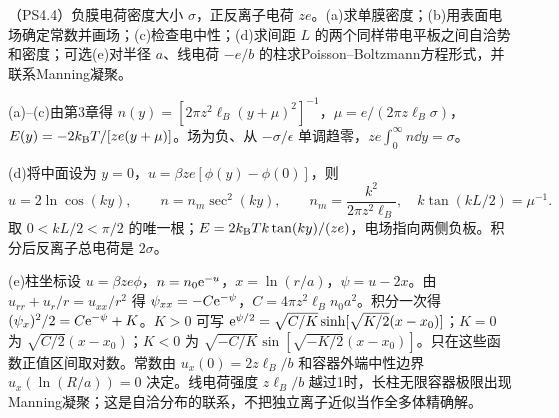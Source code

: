 \begin{exercise}
（PS4.4）负膜电荷密度大小 $\sigma$，正反离子电荷 $ze$。(a)求单膜密度；(b)用表面电场确定常数并画场；(c)检查电中性；(d)求间距 $L$ 的两个同样带电平板之间自洽势和密度；可选(e)对半径 $a$、线电荷 $-e/b$ 的柱求Poisson--Boltzmann方程形式，并联系Manning凝聚。
\end{exercise}
\begin{solution}
(a)--(c)由第3章得 $n(y)=[2\pi z^2\ell_B(y+\mu)^2]^{-1}$，$\mu=e/(2\pi z\ell_B\sigma)$，$E(y)=-2k_{\mathrm B} T/[ze(y+\mu)]$。场为负、从 $-\sigma/\epsilon$ 单调趋零，$ze\int_0^\infty n\dd y=\sigma$。

\begin{center}\end{center}
(d)将中面设为 $y=0$，$u=\beta ze[\phi(y)-\phi(0)]$，则
\[
u=2\ln\cos(ky),\qquad n=n_m\sec^2(ky),\qquad n_m=\frac{k^2}{2\pi z^2\ell_B},\quad
k\tan(kL/2)=\mu^{-1}.
\]
取 $0<kL/2<\pi/2$ 的唯一根；$E=2k_{\mathrm B} T k\tan(ky)/(ze)$，电场指向两侧负板。积分后反离子总电荷是 $2\sigma$。

(e)柱坐标设 $u=\beta ze\phi$，$n=n_0\mathrm e^{-u}$，$x=\ln(r/a)$，$\psi=u-2x$。由 $u_{rr}+u_r/r=u_{xx}/r^2$ 得 $\psi_{xx}=-C\mathrm e^{-\psi}$，$C=4\pi z^2\ell_B n_0a^2$。积分一次得 $(\psi_x)^2/2=C\mathrm e^{-\psi}+K$。$K>0$ 可写 $\mathrm e^{\psi/2}=\sqrt{C/K}\sinh[\sqrt{K/2}(x-x_0)]$；$K=0$ 为 $\sqrt{C/2}(x-x_0)$；$K<0$ 为 $\sqrt{-C/K}\sin[\sqrt{-K/2}(x-x_0)]$。只在这些函数正值区间取对数。常数由 $u_x(0)=2z\ell_B/b$ 和容器外端中性边界 $u_x(\ln(R/a))=0$ 决定。线电荷强度 $z\ell_B/b$ 越过1时，长柱无限容器极限出现Manning凝聚；这是自洽分布的联系，不把独立离子近似当作全多体精确解。
\end{solution}

